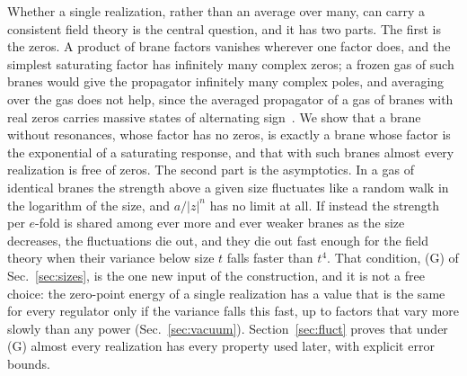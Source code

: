 \documentclass[aps,prd,10pt,twocolumn,superscriptaddress,nofootinbib,floatfix,longbibliography]{revtex4-2}
\begin{document}
Whether a single realization, rather than an average over many, can carry a consistent field theory is the central question, and it has two parts. The first is the zeros. A product of brane factors vanishes wherever one factor does, and the simplest saturating factor has infinitely many complex zeros; a frozen gas of such branes would give the propagator infinitely many complex poles, and averaging over the gas does not help, since the averaged propagator of a gas of branes with real zeros carries massive states of alternating sign~\cite{BhattacharjeeBhattacharya2026}. We show that a brane without resonances, whose factor has no zeros, is exactly a brane whose factor is the exponential of a saturating response, and that with such branes almost every realization is free of zeros. The second part is the asymptotics. In a gas of identical branes the strength above a given size fluctuates like a random walk in the logarithm of the size, and $a/|z|^{n}$ has no limit at all. If instead the strength per $e$-fold is shared among ever more and ever weaker branes as the size decreases, the fluctuations die out, and they die out fast enough for the field theory when their variance below size $t$ falls faster than $t^{4}$. That condition, (G) of Sec.~\ref{sec:sizes}, is the one new input of the construction, and it is not a free choice: the zero-point energy of a single realization has a value that is the same for every regulator only if the variance falls this fast, up to factors that vary more slowly than any power (Sec.~\ref{sec:vacuum}). Section~\ref{sec:fluct} proves that under (G) almost every realization has every property used later, with explicit error bounds.
\end{document}
